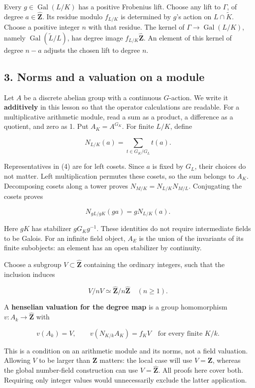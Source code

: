 \documentclass[11pt,a4paper]{article}
\begin{document}
Every \(g\in\operatorname{Gal}(L/K)\) has a positive Frobenius lift.
Choose any lift to \(\Gamma\), of degree \(a\in\widehat{\mathbf Z}\).
Its residue modulo \(f_{L/K}\) is determined by \(g\)'s action on
\(L\cap\widetilde K\). Choose a positive integer \(n\) with that
residue. The kernel of \(\Gamma\to\operatorname{Gal}(L/K)\), namely
\(\operatorname{Gal}(\widetilde L/L)\), has degree image
\(f_{L/K}\widehat{\mathbf Z}\). An element of this kernel of degree
\(n-a\) adjusts the chosen lift to degree \(n\).

\subsection{3. Norms and a valuation on a
module}\label{norms-and-a-valuation-on-a-module}

Let \(A\) be a discrete abelian group with a continuous \(G\)-action. We
write it \textbf{additively} in this lesson so that the operator
calculations are readable. For a multiplicative arithmetic module, read
a sum as a product, a difference as a quotient, and zero as 1. Put
\(A_K=A^{G_K}\). For finite \(L/K\), define

\[
N_{L/K}(a)=\sum_{t\in G_K/G_L}t(a).
\tag{4}
\]

Representatives in (4) are for left cosets. Since \(a\) is fixed by
\(G_L\), their choices do not matter. Left multiplication permutes these
cosets, so the sum belongs to \(A_K\). Decomposing cosets along a tower
proves \(N_{M/K}=N_{L/K}N_{M/L}\). Conjugating the cosets proves

\[
N_{gL/gK}(ga)=gN_{L/K}(a).
\tag{5}
\]

Here \(gK\) has stabilizer \(gG_Kg^{-1}\). These identities do not
require intermediate fields to be Galois. For an infinite field object,
\(A_E\) is the union of the invariants of its finite subobjects: an
element has an open stabilizer by continuity.

Choose a subgroup \(V\subset\widehat{\mathbf Z}\) containing the
ordinary integers, such that the inclusion induces

\[
V/nV\simeq\widehat{\mathbf Z}/n\widehat{\mathbf Z}
\quad(n\geq1).
\tag{6}
\]

A \textbf{henselian valuation for the degree map} is a group
homomorphism \(v:A_k\to\widehat{\mathbf Z}\) with

\[
v(A_k)=V,\qquad v(N_{K/k}A_K)=f_KV
\quad\text{for every finite }K/k.
\tag{7}
\]

This is a condition on an arithmetic module and its norms, not a field
valuation. Allowing \(V\) to be larger than \(\mathbf Z\) matters: the
local case will use \(V=\mathbf Z\), whereas the global number-field
construction can use \(V=\widehat{\mathbf Z}\). All proofs here cover
both. Requiring only integer values would unnecessarily exclude the
latter application.
\end{document}
